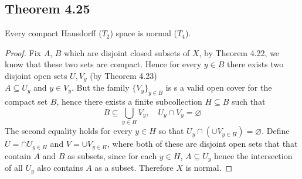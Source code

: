 \documentclass[../../main.tex]{subfiles}
\begin{document}
\subsection{Theorem 4.25}
\begin{wts}
Every compact Hausdorff ($T_2$) space is normal ($T_4$).
\end{wts}
\begin{proof}
Fix $A$, $B$ which are disjoint closed subsets of $X$, by Theorem 4.22, we know that these two sets are compact. Hence for every $y\in B$ there exists two disjoint open sets $U, V_y$ (by Theorem 4.23)\\

$A\subseteq U_y$ and $y\in V_y$. But the family $\{V_y\}_{y\in B}$ is s a valid open cover for the compact set $B$, hence there exists a finite subcollection $H\subseteq B$ such that 
\[
B\subseteq \bigcup_{y\in H}V_y,\quad U_y\cap V_y=\varnothing
\]
The second equality holds for every $y\in H$ so that $U_y\cap(\cup V_{y\in H})=\varnothing$. Define $U = \cap U_{y\in H}$ and $V = \cup V_{y\in H}$, where both of these are disjoint open sets that that contain $A$ and $B$ as subsets, since for each $y\in H$, $A\subseteq U_y$ hence the intersection of all $U_y$ also contains $A$ as a subset. Therefore $X$ is normal.
\end{proof}
\end{document}
